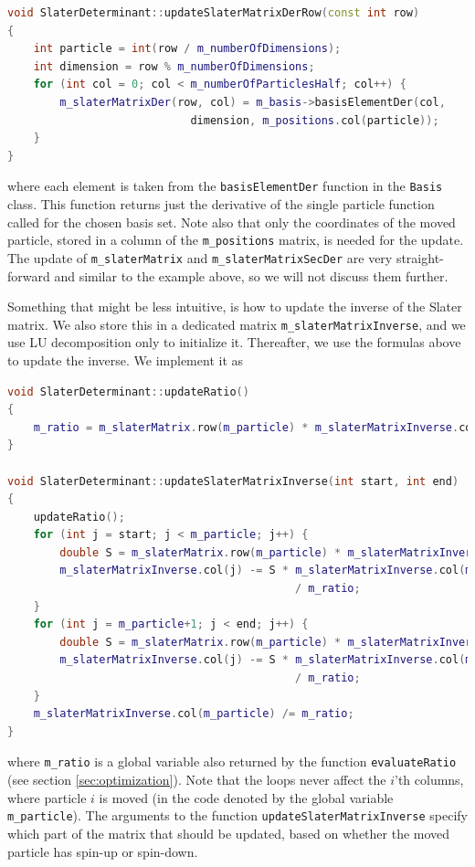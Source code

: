 \begin{lstlisting}[language={c++},caption={Taken from \lstinline{slaterdeterminant.cpp}.}]
void SlaterDeterminant::updateSlaterMatrixDerRow(const int row)
{
	int particle = int(row / m_numberOfDimensions);
	int dimension = row % m_numberOfDimensions;
	for (int col = 0; col < m_numberOfParticlesHalf; col++) {
		m_slaterMatrixDer(row, col) = m_basis->basisElementDer(col,
							dimension, m_positions.col(particle));
	}
}
\end{lstlisting}
where each element is taken from the \lstinline{basisElementDer} function in the \lstinline{Basis} class. This function returns just the derivative of the single particle function called for the chosen basis set. Note also that only the coordinates of the moved particle, stored in a column of the \lstinline{m_positions} matrix, is needed for the update. The update of \lstinline{m_slaterMatrix} and \lstinline{m_slaterMatrixSecDer} are very straight-forward and similar to the example above, so we will not discuss them further.

Something that might be less intuitive, is how to update the inverse of the Slater matrix. We also store this in a dedicated matrix \lstinline{m_slaterMatrixInverse}, and we use LU decomposition only to initialize it. Thereafter, we use the formulas above to update the inverse. We implement it as

\begin{lstlisting}[language={c++},caption={Taken from \lstinline{slaterdeterminant.cpp}.}]
void SlaterDeterminant::updateRatio()
{
	m_ratio = m_slaterMatrix.row(m_particle) * m_slaterMatrixInverse.col(m_particle);
}

void SlaterDeterminant::updateSlaterMatrixInverse(int start, int end)
{
	updateRatio();
	for (int j = start; j < m_particle; j++) {
		double S = m_slaterMatrix.row(m_particle) * m_slaterMatrixInverse.col(j);
		m_slaterMatrixInverse.col(j) -= S * m_slaterMatrixInverse.col(m_particle) 
											/ m_ratio;
	}
	for (int j = m_particle+1; j < end; j++) {
		double S = m_slaterMatrix.row(m_particle) * m_slaterMatrixInverse.col(j);
		m_slaterMatrixInverse.col(j) -= S * m_slaterMatrixInverse.col(m_particle) 
											/ m_ratio;
	}
	m_slaterMatrixInverse.col(m_particle) /= m_ratio;
}
\end{lstlisting}
where \lstinline{m_ratio} is a global variable also returned by the function \lstinline{evaluateRatio} (see section \ref{sec:optimization}). Note that the loops never affect the $i$'th columns, where particle $i$ is moved (in the code denoted by the global variable \lstinline{m_particle}). The arguments to the function \lstinline{updateSlaterMatrixInverse} specify which part of the matrix that should be updated, based on whether the moved particle has spin-up or spin-down.

